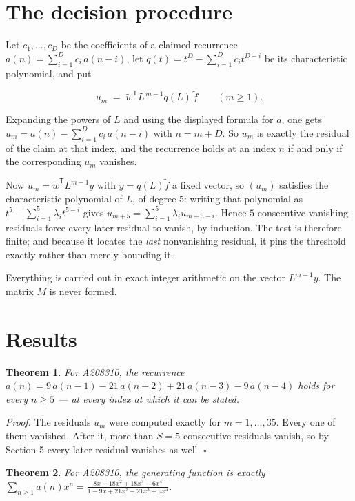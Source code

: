 \documentclass[11pt]{article}
\newtheorem{theorem}{Theorem}
\theoremstyle{definition}
\begin{document}
\section{The decision procedure}

Let $c_1,\dots,c_D$ be the coefficients of a claimed recurrence $a(n) = \sum_{i=1}^{D} c_i\,a(n-i)$, let $q(t) = t^{D} - \sum_{i=1}^{D} c_i t^{D-i}$ be its characteristic polynomial, and put

\[u_m \;=\; \tilde w^{\mathsf T} L^{\,m-1} q(L)\,\tilde f \qquad (m \ge 1).\]

Expanding the powers of $L$ and using the displayed formula for $a$, one gets $u_m = a(n) - \sum_{i=1}^{D} c_i\,a(n-i)$ with $n = m + D$. So $u_m$ is exactly the residual of the claim at that index, and the recurrence holds at an index $n$ if and only if the corresponding $u_m$ vanishes.

Now $u_m = \tilde w^{\mathsf T} L^{m-1} y$ with $y = q(L)\tilde f$ a fixed vector, so $(u_m)$ satisfies the characteristic polynomial of $L$, of degree $5$: writing that polynomial as $t^{5} - \sum_{i=1}^{5} \lambda_i t^{5-i}$ gives $u_{m+5} = \sum_{i=1}^{5} \lambda_i u_{m+5-i}$. Hence $5$ consecutive vanishing residuals force every later residual to vanish, by induction. The test is therefore finite; and because it locates the {\itshape last} nonvanishing residual, it pins the threshold exactly rather than merely bounding it.

Everything is carried out in exact integer arithmetic on the vector $L^{m-1}y$. The matrix $M$ is never formed.

\section{Results}

\begin{theorem} For A208310, the recurrence $a(n) = 9\,a(n-1) - 21\,a(n-2) + 21\,a(n-3) - 9\,a(n-4)$ holds for every $n \ge 5$ --- at every index at which it can be stated.\end{theorem}

{\itshape Proof.} The residuals $u_m$ were computed exactly for $m = 1,\dots,35$. Every one of them vanished. After it, more than $S = 5$ consecutive residuals vanish, so by Section 5 every later residual vanishes as well. $\square$

\begin{theorem} For A208310, the generating function is exactly $\sum_{n\ge 1} a(n)x^n = \frac{8x - 18x^{2} + 18x^{3} - 6x^{4}}{1 - 9x + 21x^{2} - 21x^{3} + 9x^{4}}$.\end{theorem}
\end{document}
